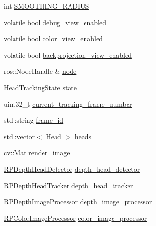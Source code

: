 \begin{DoxyCompactItemize}
\item 
int \hyperlink{class_r_p_head_tracking_node_a0735dfefd230deabd81cc96d145205ed}{\-S\-M\-O\-O\-T\-H\-I\-N\-G\-\_\-\-R\-A\-D\-I\-U\-S}
\item 
volatile bool \hyperlink{class_r_p_head_tracking_node_a1f2845c7ce72d1a8d117caebd1b1024f}{debug\-\_\-view\-\_\-enabled}
\item 
volatile bool \hyperlink{class_r_p_head_tracking_node_a90f29e5f81692d883b535c8ebcbf9cfc}{color\-\_\-view\-\_\-enabled}
\item 
volatile bool \hyperlink{class_r_p_head_tracking_node_ac8289f71606ec26d687bec74d981ff89}{backprojection\-\_\-view\-\_\-enabled}
\item 
ros\-::\-Node\-Handle \& \hyperlink{class_r_p_head_tracking_node_a47a74727765d3593c1d235dbd6cc8e34}{node}
\item 
\-Head\-Tracking\-State \hyperlink{class_r_p_head_tracking_node_abb89a5e3747c9ce5c046381c2e02b226}{state}
\item 
uint32\-\_\-t \hyperlink{class_r_p_head_tracking_node_aec215913fa33464a7fd8e068b8947d61}{current\-\_\-tracking\-\_\-frame\-\_\-number}
\item 
std\-::string \hyperlink{class_r_p_head_tracking_node_aa31ed34346bf9e26ecd127893d7107af}{frame\-\_\-id}
\item 
std\-::vector$<$ \hyperlink{struct_head}{\-Head} $>$ \hyperlink{class_r_p_head_tracking_node_a8f5e4f1e1a4ba7f043b7f35f21a141d2}{heads}
\item 
cv\-::\-Mat \hyperlink{class_r_p_head_tracking_node_a48e694794e0093a3f096cc66519ab2d9}{render\-\_\-image}
\item 
\hyperlink{class_r_p_depth_head_detector}{\-R\-P\-Depth\-Head\-Detector} \hyperlink{class_r_p_head_tracking_node_af8c98fb4b2589bd038006d9f5d682f58}{depth\-\_\-head\-\_\-detector}
\item 
\hyperlink{class_r_p_depth_head_tracker}{\-R\-P\-Depth\-Head\-Tracker} \hyperlink{class_r_p_head_tracking_node_aeb67f2aec1bc4819304ebea3da893c36}{depth\-\_\-head\-\_\-tracker}
\item 
\hyperlink{class_r_p_depth_image_processor}{\-R\-P\-Depth\-Image\-Processor} \hyperlink{class_r_p_head_tracking_node_adf69f6a784f12825b110d0a852954ef9}{depth\-\_\-image\-\_\-processor}
\item 
\hyperlink{class_r_p_color_image_processor}{\-R\-P\-Color\-Image\-Processor} \hyperlink{class_r_p_head_tracking_node_a74e4f88862813f99d7de88bc8b563efb}{color\-\_\-image\-\_\-processor}
\item 

\end{DoxyCompactItemize}
